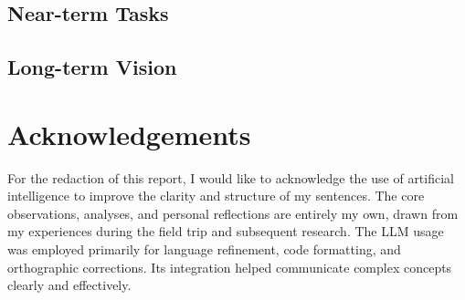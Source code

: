 \subsection{Near-term Tasks}

\subsection{Long-term Vision}

\newpage
\section*{Acknowledgements}

For the redaction of this report, I would like to acknowledge the use of artificial intelligence to improve
the clarity and structure of my sentences. The core observations, analyses, and personal reflections
are entirely my own, drawn from my experiences during the field trip and subsequent research. The
LLM usage was employed primarily for language refinement, code formatting, and orthographic corrections.
Its integration helped communicate complex concepts clearly and effectively.

\newpage
